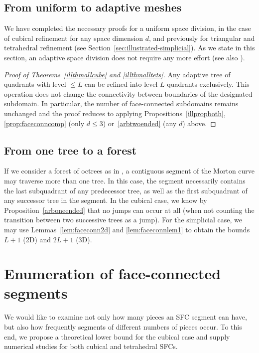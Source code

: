 \documentclass[a4paper,11pt]{article}
\newcommand{\seclab}[1]{\label{sec:#1}}
\newcommand{\secref}[1]{Section~\ref{sec:#1}}
\begin{document}
\subsection{From uniform to adaptive meshes}
\seclab{main}

We have completed the necessary proofs for a uniform space division, in the
case of cubical refinement for any space dimension $d$, and previously for
triangular and tetrahedral refinement (see \secref{illustrated-simplicial}).
As we state in this section, an adaptive space division does not require any
more effort (see also \cite[page 176]{Bader12}).
\begin{proof}[Proof of Theorems~\ref{illthmallcube} and \ref{illthmalltets}]Any adaptive tree of quadrants with level $\le L$ can be refined into level
  $L$ quadrants exclusively.  This operation does not change the connectivity
  between boundaries of the designated subdomain.  In particular, the number of
  face-connected subdomains remains unchanged and the proof reduces to applying
  Propositions~\ref{illpropboth}, \ref{prop:faceconncomp} (only $d \le 3$)
  or~\ref{arbtwoended} (any $d$) above.
\end{proof}

\subsection{From one tree to a forest}
\seclab{forest}



If we consider a forest of octrees as in \cite{StewartEdwards04,
BangerthHartmannKanschat07, BursteddeWilcoxGhattas11}, a contiguous segment of
the Morton curve may traverse more than one tree.
In this case, the segment necessarily contains the last subquadrant of any
predecessor tree, as well as the first subquadrant of any successor tree in the
segment.
In the cubical case, we know by Proposition~\ref{arboneended} that no jumps can
occur at all (when not counting the transition between two successive trees as
a jump).
For the simplicial case, we may use Lemmas~\ref{lem:faceconn2d} and
\ref{lem:faceconnlem1} to obtain
the bounds $L+1$ (2D) and $2L+1$ (3D).


\section{Enumeration of face-connected segments}
\seclab{enumeration}

We would like to examine not only how many pieces an SFC segment can have, but
also how frequently segments of different numbers of pieces occur.
To this end, we propose a theoretical lower bound for the cubical case
and supply numerical studies for both cubical and tetrahedral SFCs.
\end{document}
